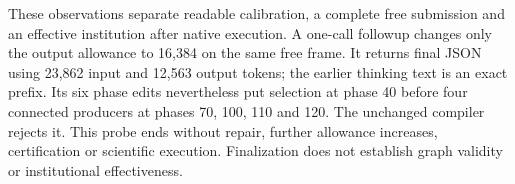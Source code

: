 These observations separate readable calibration, a complete free submission
and an effective institution after native execution. A one-call followup
changes only the output allowance to 16,384 on the same free frame. It returns
final JSON using 23,862 input and 12,563 output tokens; the earlier thinking
text is an exact prefix. Its six phase edits nevertheless put selection at
phase 40 before four connected producers at phases 70, 100, 110 and 120.
The unchanged compiler rejects it. This probe ends without repair, further
allowance increases, certification or scientific execution. Finalization does
not establish graph validity or institutional effectiveness.
\FloatBarrier
